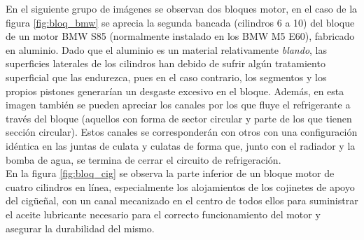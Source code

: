 En el siguiente grupo de imágenes se observan dos bloques motor, en el caso de la figura \ref{fig:bloq_bmw} se aprecia la segunda bancada (cilindros 6 a 10) del bloque de un motor BMW S85 (normalmente instalado en los BMW M5 E60), fabricado en aluminio. Dado que el aluminio es un material relativamente \textit{blando}, las superficies laterales de los cilindros han debido de sufrir algún tratamiento superficial que las endurezca, pues en el caso contrario, los segmentos y los propios pistones generarían un desgaste excesivo en el bloque. Además, en esta imagen también se pueden apreciar los canales por los que fluye el refrigerante a través del bloque (aquellos con forma de sector circular y parte de los que tienen sección circular). Estos canales se corresponderán con otros con una configuración idéntica en las juntas de culata y culatas de forma que, junto con el radiador y la bomba de agua, se termina de cerrar el circuito de refrigeración.\\

En la figura \ref{fig:bloq_cig} se observa la parte inferior de un bloque motor de cuatro cilindros en línea, especialmente los alojamientos de los cojinetes de apoyo del cigüeñal, con un canal mecanizado en el centro de todos ellos para suministrar el aceite lubricante necesario para el correcto funcionamiento del motor y asegurar la durabilidad del mismo.\\

